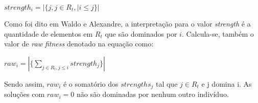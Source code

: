 \documentclass[]{article}
\begin{document}
 \begin{large}
 \begin{center}
  	 $strength_i = |\{j,j \in R_t, | i \leq j\}|$
  \end{center}
 \end{large}
  
   Como foi dito em Waldo e Alexandre, \cite{WaldoAlexandre} a interpretação para o valor  \textit{strength} é a quantidade de elementos em $R_t$ que são dominados por $i$. Calcula-se, também o valor de \textit{raw fitness} denotado na equação como:
   
\begin{large}
 \begin{center}
  	 $raw_i = |\{\sum_{j \in R_t, j\leq i} strength_j\}|$
  \end{center}
\end{large}
   
    Sendo assim,  $raw_i$ é o somatório dos $strengths_j$ tal que $j \in R_t$ e j domina i. As soluções com $raw_i = 0$ não são dominadas por nenhum outro indivíduo.  
    
    
\newpage


\end{document}
